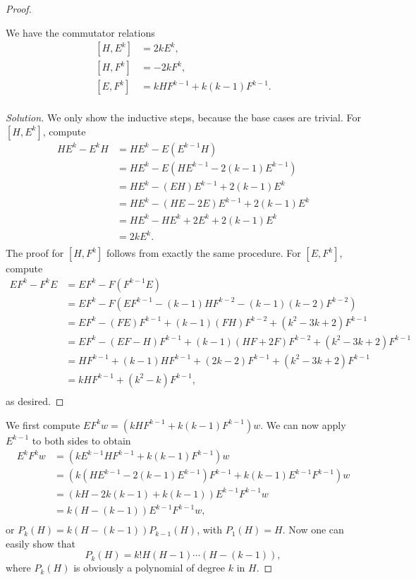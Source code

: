 \documentclass{article}
\begin{document}
\begin{proof}
\begin{lem}
We have the commutator relations
\[ \begin{aligned}
[H, E^k] &= 2k E^k, \\
[H, F^k] &= -2k F^k, \\
[E, F^k] &= k H F^{k - 1} + k(k - 1) F^{k - 1}. \\
\end{aligned} \]
\end{lem}
\begin{proof}[Solution]
We only show the inductive steps, because the base cases are trivial. For $[H,
E^k]$, compute
\[ \begin{aligned}
H E^k - E^k H  &= H E^k - E (E^{k - 1} H) \\
&= H E^k - E (H E^{k - 1} - 2(k - 1) E^{k - 1}) \\
&= H E^k - (E H) E^{k - 1} + 2(k - 1) E^k \\
&= H E^k - (H E - 2 E) E^{k - 1} + 2(k - 1) E^k \\
&= H E^k - H E^k + 2 E^k + 2(k - 1) E^k \\
&= 2k E^k. \\
\end{aligned} \]
The proof for $[H, F^k]$ follows from exactly the same procedure. For $[E,
F^k]$, compute
\[ \begin{aligned}
E F^k - F^k E &= E F^k - F (F^{k - 1} E) \\
&= E F^k - F (E F^{k - 1} - (k - 1) H F^{k - 2} - (k - 1)(k - 2) F^{k - 2}) \\
&= E F^k - (F E) F^{k - 1} + (k - 1)(F H) F^{k - 2} + (k^2 - 3k + 2) F^{k - 1}
\\
&= E F^k - (E F - H) F^{k - 1} + (k - 1)(H F + 2F) F^{k - 2} + (k^2 - 3k + 2)
F^{k - 1} \\
&= H F^{k - 1} + (k - 1) H F^{k - 1} + (2k - 2) F^{k - 1} + (k^2 - 3k + 2) F^{k
- 1} \\
&= k H F^{k - 1} + (k^2 - k) F^{k - 1}, \\
\end{aligned} \]
as desired.
\end{proof}

We first compute $E F^k w = (k H F^{k - 1} + k(k - 1) F^{k - 1}) w$. We can now
apply $E^{k - 1}$ to both sides to obtain
\[ \begin{aligned}
E^k F^k w &= (k E^{k - 1} H F^{k - 1} + k(k - 1) F^{k - 1}) w \\
&= (k (H E^{k - 1} - 2(k - 1) E^{k - 1}) F^{k - 1} + k(k - 1) E^{k - 1} F^{k -
1}) w \\
&= (k H - 2k(k - 1) + k(k - 1)) E^{k - 1} F^{k - 1} w \\
&= k (H - (k - 1)) E^{k - 1} F^{k - 1} w, \\
\end{aligned} \]
or $P_k(H) = k(H - (k - 1)) P_{k - 1}(H)$, with $P_1(H) = H$. Now one can easily
show that
\[ P_k(H) = k! H (H - 1) \cdots (H - (k - 1)), \]
where $P_k(H)$ is obviously a polynomial of degree $k$ in $H$.
\end{proof}
\end{document}
